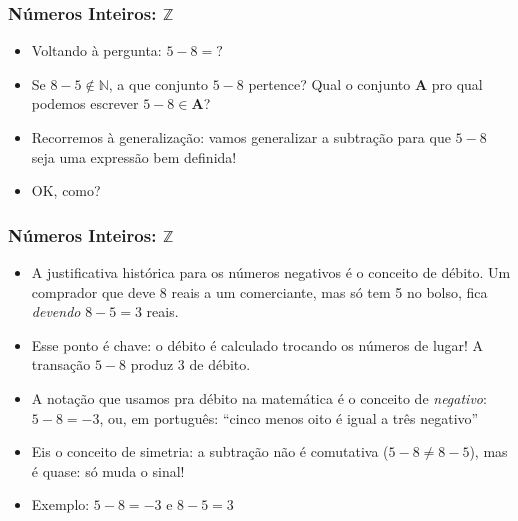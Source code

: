 \documentclass[usenames,dvipsnames,svgnames]{beamer}
\begin{document}
\begin{frame}
	
	\frametitle{Números Inteiros: $\mathbb{Z}$}

	\begin{itemize}
		\item Voltando à pergunta: $5 - 8 = ?$
		\item Se $8 - 5 \not\in \mathbb{N}$, a que conjunto $5 - 8$ pertence? Qual o conjunto $\mathbf{A}$ pro qual podemos escrever $5 - 8 \in \mathbf{A}$?
		\item Recorremos à {\color{red}generalização}: vamos generalizar a subtração para que $5 - 8$ seja uma expressão bem definida!
		\item OK, como?
 	\end{itemize}

\end{frame}

\begin{frame}
	
	\frametitle{Números Inteiros: $\mathbb{Z}$}

	\begin{itemize}
		\item A justificativa histórica para os números negativos é o conceito de {\color{red}débito}. Um comprador que deve 8 reais a um comerciante, mas só tem 5 no bolso, fica \emph{devendo} $8 - 5 = 3$ reais.
		\item Esse ponto é chave: o débito é calculado trocando os números de lugar! A transação $5 - 8$ produz $3$ de débito.
		\item A notação que usamos pra débito na matemática é o conceito de \emph{negativo}: $5 - 8 = -3$, ou, em português: ``cinco menos oito é igual a três negativo''
		\item Eis o conceito de {\color{red}simetria}: a subtração não é comutativa ($5-8 \neq 8-5$), mas é {\color{red}quase}: só muda o sinal!
		\item Exemplo: $5-8=-3$ e $8-5=3$ 
 	\end{itemize}

\end{frame}
\end{document}

